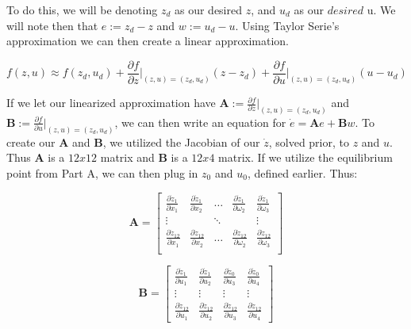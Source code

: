 \documentclass{article}
\begin{document}
To do this, we will be denoting $z_d$ as our desired $z$, and $u_d$ as our $desired$ u. We will note then that $e := z_d - z$ and $w := u_d - u$. Using Taylor Serie's approximation we can then create a linear approximation.

\begin{equation}
    f(z, u) \approx f(z_d, u_d) + \frac{\partial f}{\partial z} \Big|_{(z,u)=(z_d, u_d)}(z-z_d) + \frac{\partial f}{\partial u} \Big|_{(z,u)=(z_d,u_d)}(u-u_d)
\end{equation}

If we let our linearized approximation have $\boldsymbol{A} := \frac{\partial f}{\partial z} \Big|_{(z,u)=(z_d, u_d)}$ and $\boldsymbol{B} := \frac{\partial f}{\partial u} \Big|_{(z,u)=(z_d,u_d)}$, we can then write an equation for $\dot{e} = \boldsymbol{A}e + \boldsymbol{B}w$. To create our $\boldsymbol{A}$ and $\boldsymbol{B}$, we utilized the Jacobian of our $\dot{z}$, solved prior, to $z$ and $u$. Thus $\boldsymbol{A}$ is a $12x12$ matrix and $\boldsymbol{B}$ is a $12x4$ matrix. If we utilize the equilibrium point from Part A, we can then plug in $z_0$ and $u_0$, defined earlier. Thus:

\begin{equation}
    \boldsymbol{A} = \begin{bmatrix}
        \frac{\partial \dot{z}_1}{\partial{x_1}} & \frac{\partial \dot{z}_1}{\partial{x_2}} & \ldots & \frac{\partial \dot{z}_1}{\partial \omega_2} & \frac{\partial \dot{z}_1}{\partial \omega_3} \\
        \vdots & & \ddots & & \vdots \\
        \frac{\partial \dot{z}_{12}}{\partial{x_1}} & \frac{\partial \dot{z}_{12}}{\partial{x_2}} & \ldots & \frac{\partial \dot{z}_{12}}{\partial \omega_2} & \frac{\partial \dot{z}_{12}}{\partial \omega_3} \\
    \end{bmatrix}
\end{equation}

\begin{equation}
    \boldsymbol{B} = \begin{bmatrix}
        \frac{\partial \dot{z}_1}{\partial{u_1}} & \frac{\partial \dot{z}_1}{\partial{u_2}} & \frac{\partial \dot{z}_0}{\partial u_3} & \frac{\partial \dot{z}_0}{\partial u_4} \\
        \vdots & \vdots & \vdots & \vdots \\
        \frac{\partial \dot{z}_{12}}{\partial{u_1}} & \frac{\partial \dot{z}_{12}}{\partial{u_2}} & \frac{\partial \dot{z}_{12}}{\partial u_3} & \frac{\partial \dot{z}_{12}}{\partial u_4}
    \end{bmatrix}
\end{equation}
\end{document}
